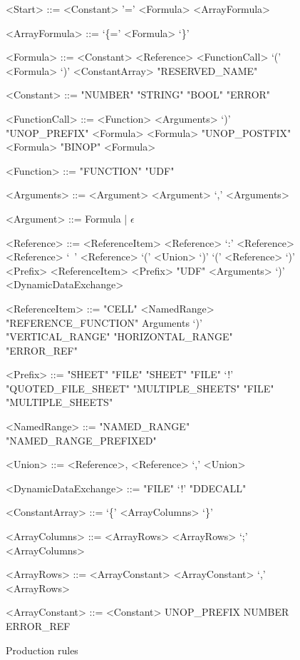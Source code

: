 \documentclass[conference]{IEEEtran}
\begin{document}
\begin{figure}
\centering
\label{figure:productions}
\caption{Production rules}
\begin{grammar}
<Start> ::= <Constant>
	\alt '=' <Formula>
	\alt <ArrayFormula>
	
<ArrayFormula> ::= `\{=' <Formula> `\}'

<Formula> ::= <Constant>
         \alt <Reference>
         \alt <FunctionCall>
         \alt `(' <Formula> `)'
         \alt <ConstantArray>
         \alt "RESERVED_NAME"
         
<Constant> ::= "NUMBER"
         \alt "STRING"
         \alt "BOOL"
         \alt "ERROR"
         
<FunctionCall> ::= <Function> <Arguments> `)'
		\alt "UNOP_PREFIX" <Formula>
		\alt <Formula> "UNOP_POSTFIX"
		\alt <Formula> "BINOP" <Formula>

<Function> ::= "FUNCTION"
	\alt "UDF"
	
<Arguments> ::= <Argument>
	\alt <Argument> `,' <Arguments>

<Argument> ::= Formula | $\epsilon$

<Reference> ::= <ReferenceItem>
	\alt <Reference> `:' <Reference>
	\alt <Reference> `\ ' <Reference>
	\alt `(' <Union> `)'
	\alt `(' <Reference> `)' 
	\alt <Prefix> <ReferenceItem>
    \alt <Prefix> "UDF" <Arguments> `)'
    \alt <DynamicDataExchange>
    
<ReferenceItem> ::= "CELL"
	\alt <NamedRange>
	\alt "REFERENCE_FUNCTION" Arguments `)'
	\alt "VERTICAL_RANGE"
	\alt "HORIZONTAL_RANGE"
	\alt "ERROR_REF"
	
<Prefix> ::= "SHEET"
	\alt "FILE" "SHEET"
	\alt "FILE" `!'
	\alt "QUOTED_FILE_SHEET"
	\alt "MULTIPLE_SHEETS"
	\alt "FILE" "MULTIPLE_SHEETS"
	
<NamedRange> ::= "NAMED_RANGE"
            \alt "NAMED_RANGE_PREFIXED"

<Union> ::= <Reference>,
	\alt <Reference> `,' <Union>
	
<DynamicDataExchange> ::= "FILE" `!' "DDECALL"

<ConstantArray> ::= `\{' <ArrayColumns> `\}'

<ArrayColumns> ::= <ArrayRows>
	\alt <ArrayRows> `;' <ArrayColumns>

<ArrayRows> ::= <ArrayConstant>
	\alt <ArrayConstant> `,' <ArrayRows>
	
<ArrayConstant> ::= <Constant>
	\alt UNOP_PREFIX NUMBER
	\alt ERROR_REF

\end{grammar}
\end{figure}
\end{document}
